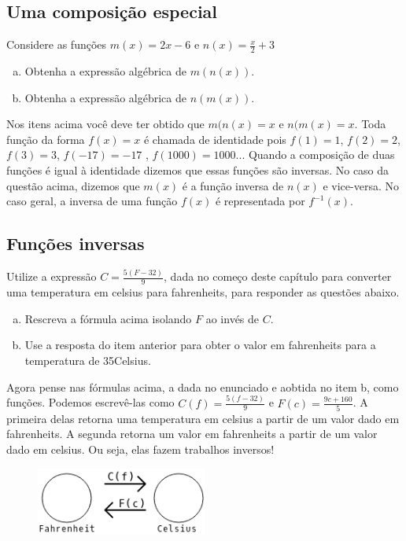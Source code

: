 \documentclass[main_estudante.tex]{subfiles}
\begin{document}
\subsection*{Uma composição especial}

\begin{questao}
Considere as funções $m(x)=2x-6$ e $n(x)=\frac{x}{2}+3$
\begin{enumerate}[a)]
\item Obtenha a expressão algébrica de $m(n(x))$.
\item Obtenha a expressão algébrica de $n(m(x))$.
\end{enumerate}
\end{questao}

Nos itens acima você deve ter obtido que $m(n(x)=x$ e $n(m(x)=x$. Toda função da forma $f(x)=x$ é chamada de identidade pois $f(1)=1$, $f(2)=2$, $f(3)=3$, $f(-17)=-17$ , $f(1000)=1000$... Quando a composição de duas funções é igual à identidade dizemos que essas funções são inversas. No caso da questão acima, dizemos que $m(x)$ é a função inversa de $n(x)$ e vice-versa. No caso geral, a inversa de uma função $f(x)$ é representada por $f^{-1}(x)$.

\subsection*{Funções inversas}

\begin{questao}
Utilize a expressão $C=\frac{5(F-32)}{9}$, dada no começo deste capítulo para converter uma temperatura em celsius para fahrenheits, para responder as questões abaixo.
\begin{enumerate}[a)]
\item Rescreva a fórmula acima isolando $F$ ao invés de $C$.
\item Use a resposta do item anterior para obter o valor em fahrenheits para a temperatura de 35\degree Celsius.
\end{enumerate}
\end{questao}

Agora pense nas fórmulas acima, a dada no enunciado e aobtida no item b, como funções. Podemos escrevê-las como $C(f)=\frac{5(f-32)}{9}$ e $F(c)=\frac{9c+160}{5}$. A primeira delas retorna uma temperatura em celsius a partir de um valor dado em fahrenheits. A segunda retorna um valor em fahrenheits a partir de um valor dado em celsius. Ou seja, elas fazem trabalhos inversos!

\begin{figure}[h]
\centering
\includegraphics[width=0.5\textwidth]{./img/c5q9.png}
\end{figure}
\end{document}
